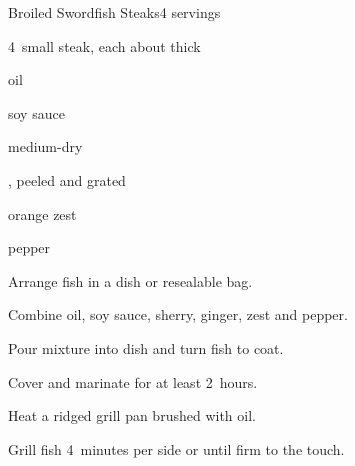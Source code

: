 \begin{recipe}{Broiled Swordfish Steaks}{}{4 servings}

\begin{ingredients}
\item 4~small  steak, each about \inch{\threequarter} thick
\item \C{\half} oil
\item {} soy sauce
\item {} medium-dry 
\item \tp{1\half} , peeled and grated 
\item {} orange zest
\item pepper
\end{ingredients}

\begin{directions}
\item Arrange fish in a dish or resealable bag.
\item Combine oil, soy sauce, sherry, ginger, zest and pepper.
\item Pour mixture into dish and turn fish to coat.
\item Cover and marinate for at least 2~hours.
\item Heat a ridged grill pan brushed with oil.
\item Grill fish 4~minutes per side or until firm to the touch.
\end{directions}

\end{recipe}
